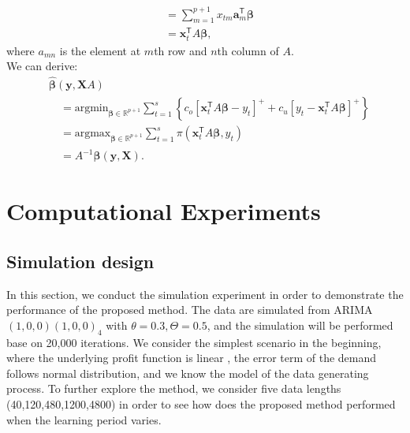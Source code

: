 \documentclass{article}
\begin{document}
\begin{itemize}
\[\begin{aligned}
            &=\displaystyle\sum_{m=1}^{p+1}x_{tm}\mathbf{a}_m^{\mathsf{T}}\boldsymbol{\beta}\\
            &=\mathbf{x}_t^{\mathsf{T}}A\boldsymbol{\beta},
        \end{aligned}
    \]
    where $a_{mn}$ is the element at $m$th row and $n$th column of $A$.\\
    We can derive:
    \[
        \begin{aligned}
            &\hat{\boldsymbol{\beta}}(\mathbf{y},\mathbf{X}A)\\
            &\quad=\text{argmin}_{\boldsymbol{\beta}\in \mathbb{R}^{p+1}}\displaystyle\sum_{t=1}^s{\left\{c_o\left[\mathbf{x}_t^{\mathsf{T}}A\boldsymbol{\beta}-y_t\right]^{+}+c_u\left[y_t-\mathbf{x}_t^{\mathsf{T}}A\boldsymbol{\beta}\right]^{+}\right\}}\\
            &\quad=\text{argmax}_{\boldsymbol{\beta}\in \mathbb{R}^{p+1}}\displaystyle\sum_{t=1}^s{\pi(\mathbf{x}_t^{\mathsf{T}}A\boldsymbol{\beta},y_t)}\\
            &\quad=A^{-1}\hat{\boldsymbol{\beta}}(\mathbf{y},\mathbf{X}).
        \end{aligned}
    \]
    
\end{itemize}



\section{Computational Experiments} \label{se:results}

\subsection{Simulation design}

In this section, we conduct the simulation experiment in order to demonstrate the performance of the proposed method. The data are simulated from ARIMA $(1,0,0)(1,0,0)_4$ with $\theta=0.3,\Theta=0.5$, and the simulation will be performed base on 20,000 iterations. We consider the simplest scenario in the beginning, where the underlying profit function is linear
, the error term of the demand follows normal distribution, and we know the model of the data generating process. To further explore the method, we consider five data lengths (40,120,480,1200,4800) in order to see how does the proposed method performed when the learning period varies.
\end{document}
